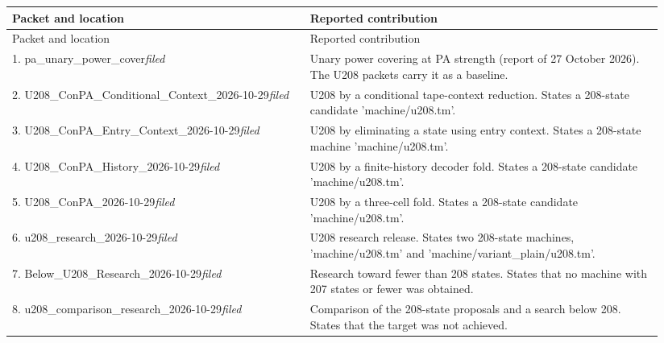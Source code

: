 \begingroup\footnotesize
\begin{longtable}{@{}p{0.43\linewidth}p{0.51\linewidth}@{}}
\toprule Packet and location & Reported contribution\\\midrule\endfirsthead
\toprule Packet and location & Reported contribution\\\midrule\endhead
1. pa\_\allowbreak{}unary\_\allowbreak{}power\_\allowbreak{}cover\newline\emph{filed} & Unary power covering at PA strength (report of 27 October 2026). The U208 packets carry it as a baseline.\\[5pt]
2. U208\_\allowbreak{}ConPA\_\allowbreak{}Conditional\_\allowbreak{}Context\_\allowbreak{}2026-10-29\newline\emph{filed} & U208 by a conditional tape-context reduction. States a 208-state candidate 'machine/u208.tm'.\\[5pt]
3. U208\_\allowbreak{}ConPA\_\allowbreak{}Entry\_\allowbreak{}Context\_\allowbreak{}2026-10-29\newline\emph{filed} & U208 by eliminating a state using entry context. States a 208-state machine 'machine/u208.tm'.\\[5pt]
4. U208\_\allowbreak{}ConPA\_\allowbreak{}History\_\allowbreak{}2026-10-29\newline\emph{filed} & U208 by a finite-history decoder fold. States a 208-state candidate 'machine/u208.tm'.\\[5pt]
5. U208\_\allowbreak{}ConPA\_\allowbreak{}2026-10-29\newline\emph{filed} & U208 by a three-cell fold. States a 208-state candidate 'machine/u208.tm'.\\[5pt]
6. u208\_\allowbreak{}research\_\allowbreak{}2026-10-29\newline\emph{filed} & U208 research release. States two 208-state machines, 'machine/u208.tm' and 'machine/variant\_\allowbreak{}plain/u208.tm'.\\[5pt]
7. Below\_\allowbreak{}U208\_\allowbreak{}Research\_\allowbreak{}2026-10-29\newline\emph{filed} & Research toward fewer than 208 states. States that no machine with 207 states or fewer was obtained.\\[5pt]
8. u208\_\allowbreak{}comparison\_\allowbreak{}research\_\allowbreak{}2026-10-29\newline\emph{filed} & Comparison of the 208-state proposals and a search below 208. States that the target was not achieved.\\[5pt]

\end{longtable}
